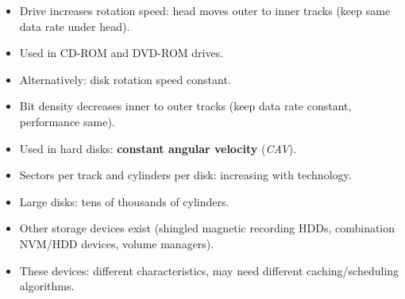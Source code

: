 \begin{itemize}
    \item Drive increases rotation speed: head moves outer to inner tracks (keep same data rate under head).
    \item Used in CD-ROM and DVD-ROM drives.
    \item Alternatively: disk rotation speed constant.
    \item Bit density decreases inner to outer tracks (keep data rate constant, performance same).
    \item Used in hard disks: \textbf{constant angular velocity} (\textit{CAV}).
    \item Sectors per track and cylinders per disk: increasing with technology.
    \item Large disks: tens of thousands of cylinders.
    \item Other storage devices exist (shingled magnetic recording HDDs, combination NVM/HDD devices, volume managers).
    \item These devices: different characteristics, may need different caching/scheduling algorithms.
\end{itemize}

